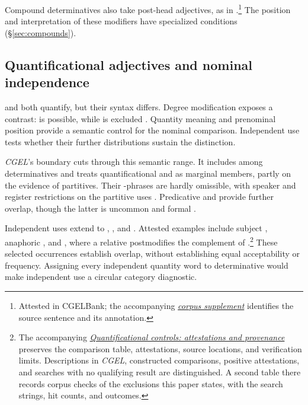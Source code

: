 \documentclass[12pt]{article}
\begin{document}
Compound determinatives also take post-head adjectives, as in .\footnote{Attested in CGELBank; the accompanying \href{run:corpus-documentation.pdf}{\textit{corpus supplement}} identifies the source sentence and its annotation.} The position and interpretation of these modifiers have specialized conditions (§\ref{sec:compounds}).

\subsection{Quantificational adjectives and nominal independence}\label{sec:quant-controls}

 and  both quantify, but their syntax differs. Degree modification exposes a contrast:  is possible, while  is excluded \citep[539--540]{huddleston2002}. Quantity meaning and prenominal position provide a semantic control for the nominal comparison. Independent use tests whether their further distributions sustain the distinction.

\textit{CGEL}'s boundary cuts through this semantic range. It includes  among determinatives and treats quantificational  and  as marginal members, partly on the evidence of partitives. Their -phrases are hardly omissible, with speaker and register restrictions on the partitive uses \citep[392--393, 411--413]{huddleston2002}. Predicative  and  provide further overlap, though the latter is uncommon and formal \citep[392, 395--396]{huddleston2002}.

Independent uses extend to , , and . Attested examples include subject , anaphoric , and , where a relative postmodifies the complement of .\footnote{The accompanying \href{run:quantifier-controls.pdf}{\textit{Quantificational controls: attestations and provenance}} preserves the comparison table, attestations, source locations, and verification limits. Descriptions in \textit{CGEL}, constructed comparisons, positive attestations, and searches with no qualifying result are distinguished. A second table there records corpus checks of the exclusions this paper states, with the search strings, hit counts, and outcomes.} These selected occurrences establish overlap, without establishing equal acceptability or frequency. Assigning every independent quantity word to determinative would make independent use a circular category diagnostic.
\end{document}
